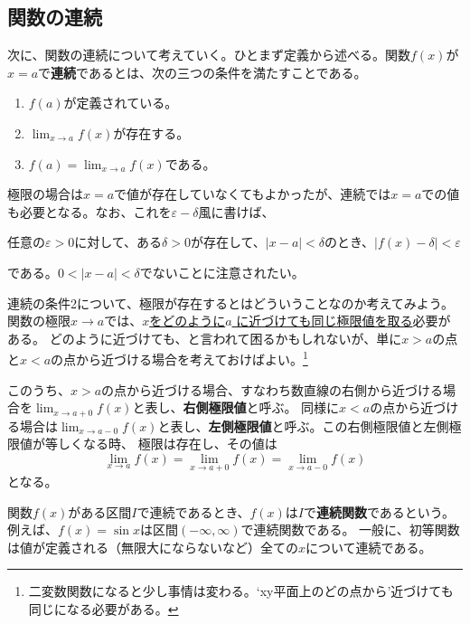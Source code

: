 \documentclass[a4j,dvipdfmx]{jsarticle}
\begin{document}
            \subsection{関数の連続}
                次に、関数の連続について考えていく。ひとまず定義から述べる。関数$f(x)$が$x=a$で\textbf{連続}であるとは、次の三つの条件を満たすことである。
                \begin{enumerate}
                    \item $f(a)$が定義されている。
                    \item $\displaystyle\lim_{x\to a}f(x)$が存在する。
                    \item $\displaystyle f(a)=\lim_{x\to a}f(x)$である。
                \end{enumerate}
                極限の場合は$x=a$で値が存在していなくてもよかったが、連続では$x=a$での値も必要となる。なお、これを$\varepsilon-\delta$風に書けば、
                \begin{screen}
                    任意の$\varepsilon>0$に対して、ある$\delta >0$が存在して、$|x-a|<\delta $のとき、$|f(x)-\delta|<\varepsilon$
                \end{screen}
                である。$0<|x-a|<\delta$でないことに注意されたい。

                連続の条件2について、極限が存在するとはどういうことなのか考えてみよう。関数の極限$x\to a$では、\underline{$x$をどのように$a$
                に近づけても同じ極限値を取る}必要がある。
                どのように近づけても、と言われて困るかもしれないが、単に$x>a$の点と$x<a$の点から近づける場合を考えておけばよい。\footnote{二変数関数になると少し事情は変わる。`xy平面上のどの点から'近づけても同じになる必要がある。}

                このうち、$x>a$の点から近づける場合、すなわち数直線の右側から近づける場合を$\displaystyle\lim_{x\to a+0}f(x)$と表し、\textbf{右側極限値}と呼ぶ。
                同様に$x<a$の点から近づける場合は$\displaystyle\lim_{x\to a-0}f(x)$と表し、\textbf{左側極限値}と呼ぶ。この右側極限値と左側極限値が等しくなる時、
                極限は存在し、その値は
                \begin{equation}
                    \lim_{x\to a}f(x)=\lim_{x\to a+0}f(x)=\lim_{x\to a-0}f(x)
                \end{equation}
                となる。

                関数$f(x)$がある区間$I$で連続であるとき、$f(x)$は$I$で\textbf{連続関数}であるという。例えば、$f(x)=\sin x$は区間$(-\infty,\infty)$で連続関数である。
                一般に、初等関数は値が定義される（無限大にならないなど）全ての$x$について連続である。
\end{document}
